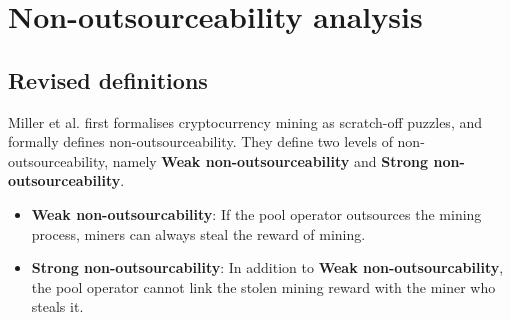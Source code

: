 \section{Non-outsourceability analysis}
\label{sec:non_outsourceability}



\subsection{Revised definitions}

Miller et al. \cite{miller2015nonoutsourceable} first formalises cryptocurrency mining as scratch-off puzzles, and formally defines non-outsourceability.
They define two levels of non-outsourceability, namely \textbf{Weak non-outsourceability} and \textbf{Strong non-outsourceability}.

\begin{itemize}
    \item \textbf{Weak non-outsourcability}: If the pool operator outsources the mining process, miners can always steal the reward of mining.
    \item \textbf{Strong non-outsourcability}: In addition to \textbf{Weak non-outsourcability}, the pool operator cannot link the stolen mining reward with the miner who steals it.
\end{itemize}

